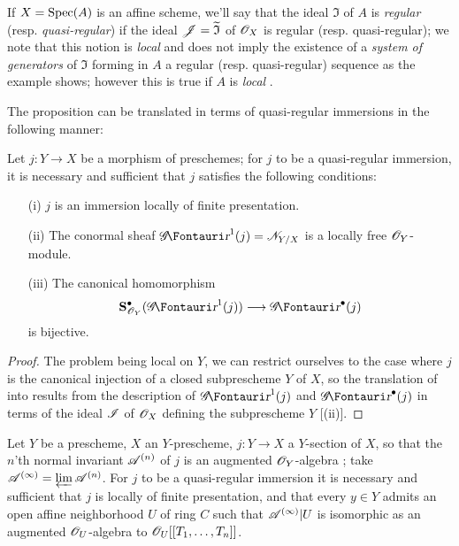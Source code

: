 \begin{env}[16.9.7]
\label{IV.16.9.7}
If $X = \operatorname{Spec}(A)$ is an affine scheme, we'll say that the ideal $\mathfrak{I}$ of $A$ is \emph{regular} (resp. \emph{quasi-regular}) if the ideal $\mathscr{J} = \widetilde{\mathfrak{I}}$ of $\mathscr{O}_X$ is regular (resp. quasi-regular);
we note that this notion is \emph{local} and does not imply the existence of a \emph{system of generators} of $\mathfrak{I}$ forming in $A$ a regular (resp. quasi-regular) sequence as the example  shows;
however this is true if $A$ is \emph{local} .

The proposition  can be translated in terms of quasi-regular immersions in the following manner:
\end{env}

\begin{proposition}[16.9.8]
\label{IV.16.9.8}
Let $j:Y \to X$ be a morphism of preschemes;
for $j$ to be a quasi-regular immersion, it is necessary and sufficient that $j$ satisfies the following conditions:
\begin{enumerate}
  \item[(i)] $j$ is an immersion locally of finite presentation.
  \item[(ii)] The conormal sheaf $\shGr^1(j) = \sh{N}_{Y/X}$  is a locally free $\mathscr{O}_Y$-module.
  \item[(iii)] The canonical homomorphism
  \[
    \bb{S}_{\sh{O}_Y}^\bullet(\shGr^1(j)) \to \shGr^\bullet(j)
  \]
   is bijective.
\end{enumerate}
\end{proposition}

\begin{proof}
The problem being local on $Y$, we can restrict ourselves to the case where $j$ is the canonical injection of a closed subprescheme $Y$ of $X$, so the translation of  into  results from the description of $\shGr^1(j)$ and $\shGr^\bullet(j)$ in terms of the ideal $\mathscr{I}$ of $\mathscr{O}_X$ defining the subprescheme $Y$ [(ii)].
\end{proof}

\begin{corollary}[16.9.9]
\label{IV.16.9.9}
Let $Y$ be a prescheme, $X$ an $Y$-prescheme, $j:Y \to X$ a $Y$-section of $X$, so that the $n$'th normal invariant $\mathscr{A}^{(n)}$ of $j$  is an augmented $\mathscr{O}_Y$-algebra ;
take $\mathscr{A}^{(\infty)} = \varprojlim \mathscr{A}^{(n)}$.
For $j$ to be a quasi-regular immersion it is necessary and sufficient that $j$ is locally of finite presentation, and that every $y \in Y$ admits an open affine neighborhood $U$ of ring $C$ such that $\mathscr{A}^{(\infty)}|U$ is isomorphic as an augmented $\mathscr{O}_U$-algebra to $\mathscr{O}_U[[T_1, \dots, T_n]]$.
\end{corollary}

